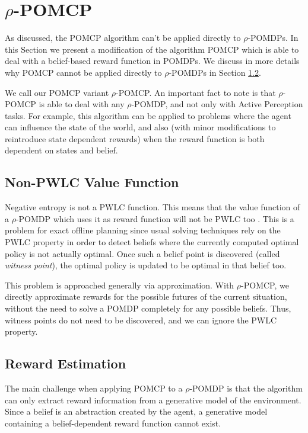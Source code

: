 \section{$\rho$-POMCP}

As discussed, the POMCP algorithm can't be applied directly to $\rho$-POMDPs. In this Section we
present a modification of the algorithm POMCP which is able to deal with a belief-based reward
function in POMDPs. We discuss in more details why POMCP cannot be applied directly to $\rho$-POMDPs
in Section \ref{ref:rewestimation}.

We call our POMCP variant $\rho$-POMCP. An important fact to note is that $\rho$-POMCP is able to deal
with any $\rho$-POMDP, and not only with Active Perception tasks. For example, this algorithm can be
applied to problems where the agent can influence the state of the world, and also (with minor
modifications to reintroduce state dependent rewards) when the reward function is both dependent on
states and belief.

\subsection{Non-PWLC Value Function}

Negative entropy is not a PWLC function. This means that the value function of a $\rho$-POMDP which
uses it as reward function will not be PWLC too \cite{cit:rpomdp}. This is a problem for exact
offline planning since usual solving techniques rely on the PWLC property in order to detect beliefs
where the currently computed optimal policy is not actually optimal. Once such a belief point is
discovered (called \textit{witness point}), the optimal policy is updated to be optimal in that
belief too.

This problem is approached generally via approximation. With $\rho$-POMCP, we directly approximate
rewards for the possible futures of the current situation, without the need to solve a POMDP
completely for any possible beliefs. Thus, witness points do not need to be discovered, and we can
ignore the PWLC property.

\subsection{Reward Estimation}\label{ref:rewestimation}

The main challenge when applying POMCP to a $\rho$-POMDP is that the algorithm can only extract
reward information from a generative model of the environment. Since a belief is an abstraction
created by the agent, a generative model containing a belief-dependent reward function cannot exist.

